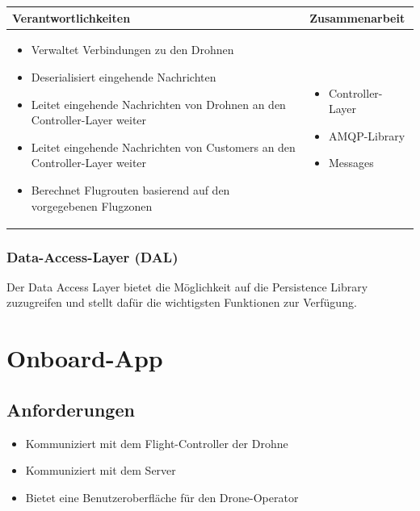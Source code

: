\begin{tabular}{|p{}|p{}|} \hline
	\textbf{Verantwortlichkeiten} & \textbf{Zusammenarbeit} \\ \hline \hline
	
	\begin{itemize}
		\item Verwaltet Verbindungen zu den Drohnen
		\item Deserialisiert eingehende Nachrichten
		\item Leitet eingehende Nachrichten von Drohnen an den Controller-Layer weiter	
		\item Leitet eingehende Nachrichten von Customers an den Controller-Layer weiter	
		\item Berechnet Flugrouten basierend auf den vorgegebenen Flugzonen
	\end{itemize}&
	\begin{itemize}
		\item Controller-Layer
		\item AMQP-Library
		\item Messages
	\end{itemize}
	\\ \hline
\end{tabular}

\subsubsection{Data-Access-Layer (DAL)}

Der Data Access Layer bietet die Möglichkeit auf die Persistence Library zuzugreifen und stellt dafür die wichtigsten Funktionen zur Verfügung. 

\section{Onboard-App}

\subsection{Anforderungen}

\begin{itemize}
	\item Kommuniziert mit dem Flight-Controller der Drohne
	\item Kommuniziert mit dem Server
	\item Bietet eine Benutzeroberfläche für den Drone-Operator 
\end{itemize}

